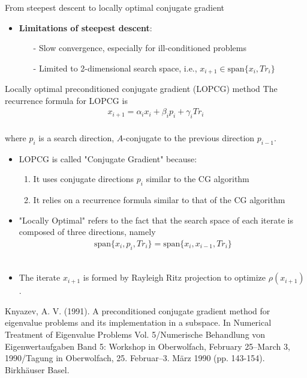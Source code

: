 \documentclass[t,usepdftitle=false]{beamer}
\begin{document}
\begin{frame}{From steepest descent to locally optimal conjugate gradient}
\begin{itemize}
\item \textbf{Limitations of steepest descent}:
\begin{itemize}\normalsize
\item[-] Slow convergence, especially for ill-conditioned problems
\item[-] Limited to 2-dimensional search space, i.e., $x_{i+1}\in\text{span}\{x_i, Tr_i\}$
\end{itemize}
\end{itemize}
\vspace{-.1cm}
\begin{block}{Locally optimal preconditioned conjugate gradient (LOPCG) method}
The recurrence formula for LOPCG is\vspace{-.4cm}
\begin{align*}
x_{i+1} = \alpha_i x_i + \beta_i p_i + \gamma_i Tr_i
\end{align*}
\vspace{-.8cm}\\
where $p_i$ is a search direction, $A$-conjugate to the previous direction $p_{i-1}$.
\begin{itemize}
\item LOPCG is called "Conjugate Gradient" because:
\begin{enumerate}\normalsize
\item It uses conjugate directions $p_i$ similar to the CG algorithm\vspace{.07cm}
\item It relies on a recurrence formula similar to that of the CG algorithm
\end{enumerate}
\item "Locally Optimal" refers to the fact that the search space of each iterate is composed of three directions, namely\vspace{-.3cm}
\begin{align*}
\text{span}\{x_i, p_i, Tr_i\}=\text{span}\{x_i,x_{i-1}, Tr_i\}
\end{align*}
\vspace{-.8cm}\\
\item The iterate $x_{i+1}$ is formed by Rayleigh Ritz projection to optimize $\rho(x_{i+1})$.
\end{itemize}
\end{block}
\tiny{Knyazev, A. V. (1991). A preconditioned conjugate gradient method for eigenvalue problems and its implementation in a subspace. In Numerical Treatment of Eigenvalue Problems Vol. 5/Numerische Behandlung von Eigenwertaufgaben Band 5: Workshop in Oberwolfach, February 25–March 3, 1990/Tagung in Oberwolfach, 25. Februar–3. März 1990 (pp. 143-154). Birkhäuser Basel.}
\end{frame}
	
\end{document}
